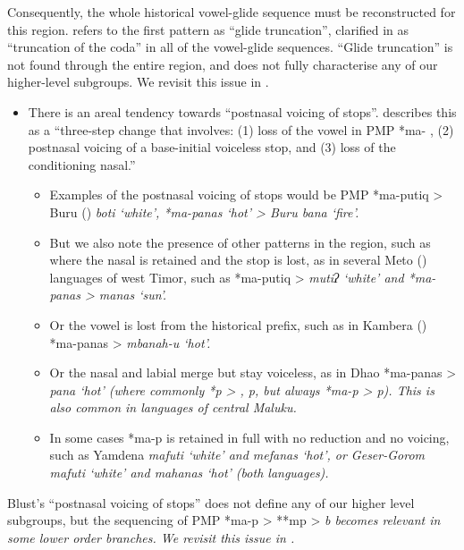 Consequently,
the whole historical vowel-glide sequence must be reconstructed for this region.
\citet{Blust1993} refers to the first pattern as “glide truncation”,
clarified in \citet[31]{Blust2009} as “truncation of the coda”
in all of the vowel-glide sequences.
“Glide truncation” is not found through the entire region,
and does not fully characterise any of our higher-level subgroups.
We revisit this issue in .

\begin{itemize}
		\item There is an areal tendency towards “postnasal voicing of stops”.
					\citet[72]{Blust2009} describes this as a “three-step change that involves:
					(1) loss of the vowel in PMP *ma- ,
					(2) postnasal voicing of a base-initial voiceless stop,
					and (3) loss of the conditioning nasal.” 
	\begin{itemize}
			\item Examples of the postnasal voicing of stops
						would be PMP *ma-putiq > Buru () \it{boti} ‘white’,
						*ma-panas ‘hot’ > Buru \it{bana} ‘fire’.
			\item But we also note the presence of
						other patterns in the region,
						such as where the nasal is retained
						and the stop is lost, as in several Meto
						() languages of west Timor,
						such as *ma-putiq > \it{mutiʔ} ‘white’
						and *ma-panas > \it{manas} ‘sun’.
			\item Or the vowel is lost from the historical prefix,
						such as in Kambera () *ma-panas > \it{mbanah-u} ‘hot’.
			\item Or the nasal and labial merge but stay voiceless,
						as in Dhao *ma-panas > \it{pana} ‘hot’
						(where commonly *p > {\0}, \it{p},
						but always *ma-p > \it{p}).
						This is also common in 
						languages of central Maluku.
			\item In some cases *ma-p is retained in full
						with no reduction and no voicing,
						such as Yamdena \it{mafuti} ‘white’
						and \it{mefanas} ‘hot’, or Geser-Gorom \it{mafuti} ‘white’
						and \it{mahanas} ‘hot’
						(both  languages).
	\end{itemize}
\end{itemize}

Blust’s “postnasal voicing of stops” does
not define any of our higher level subgroups,
but the sequencing of PMP *ma-p > **mp > \it{b}
becomes relevant in some lower order branches.
We revisit this issue in .


